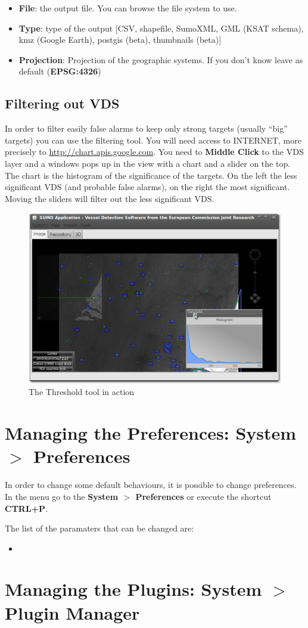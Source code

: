 \documentclass[12pt,a4paper,final]{report}
\begin{document}
\begin{itemize}
 \item \textbf{File}: the output file.
You can browse the file system to use.
 \item \textbf{Type}: type of the output [CSV, shapefile, SumoXML, GML (KSAT schema), kmz (Google Earth), postgis (beta), thumbnails (beta)]
 \item \textbf{Projection}: Projection of the geographic systems.
If you don't know leave as default (\textbf{EPSG:4326})
\end{itemize}

\subsection{Filtering out VDS}
In order to filter easily false alarms to keep only strong targets (usually ``big'' targets) you can use the filtering tool.
You will need access to INTERNET, more precisely to \url{http://chart.apis.google.com}.
You need to \textbf{Middle Click} to the VDS layer and a windows pops up in the view with a chart and a slider on the top.
The chart is the histogram of the significance of the targets.
On the left the less significant VDS (and probable false alarms), on the right the most significant.
Moving the sliders will filter out the less significant VDS.
\begin{figure}[H]
 \centering
 \includegraphics[scale=0.45,keepaspectratio=true]{./images/VDSThresh.png}
 \caption{The Threshold tool in action}
\end{figure}

\section{Managing the Preferences: System $>$ Preferences}
In order to change some default behaviours, it is possible to change preferences.
In the menu go to the \textbf{System $>$ Preferences} or execute the shortcut \textbf{CTRL+P}.

The list of the paramaters that can be changed are:
\begin{itemize}
 \item 
\end{itemize}

\section{Managing the Plugins: System $>$ Plugin Manager}
\end{document}

